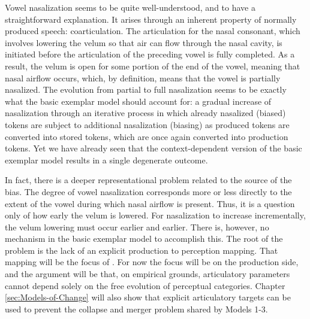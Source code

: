 Vowel nasalization seems to be quite well-understood, and to have
a straightforward explanation. It arises through an inherent property
of normally produced speech: coarticulation. The articulation for
the nasal consonant, which involves lowering the velum so that air
can flow through the nasal cavity, is initiated before the articulation
of the preceding vowel is fully completed. As a result, the velum
is open for some portion of the end of the vowel, meaning that nasal
airflow occurs, which, by definition, means that the vowel is partially
nasalized. The evolution from partial to full nasalization seems to
be exactly what the basic exemplar model should account for: a gradual
increase of nasalization through an iterative process in which already
nasalized (biased) tokens are subject to additional nasalization (biasing)
as produced tokens are converted into stored tokens, which are once
again converted into production tokens. Yet we have already seen that
the context-dependent version of the basic exemplar model results
in a single degenerate outcome. 

In fact, there is a deeper representational problem related to the
source of the bias. The degree of vowel nasalization corresponds more
or less directly to the extent of the vowel during which nasal airflow
is present. Thus, it is a question only of how early the velum is
lowered. For nasalization to increase incrementally, the velum lowering
must occur earlier and earlier. There is, however, no mechanism in
the basic exemplar model to accomplish this. The root of the problem
is the lack of an explicit production to perception mapping. That
mapping will be the focus of .
For now the focus will be on the production side, and the argument
will be that, on empirical grounds, articulatory parameters cannot
depend solely on the free evolution of perceptual categories. Chapter
\ref{sec:Models-of-Change} will also show that explicit articulatory
targets can be used to prevent the collapse and merger problem shared
by Models 1-3.
